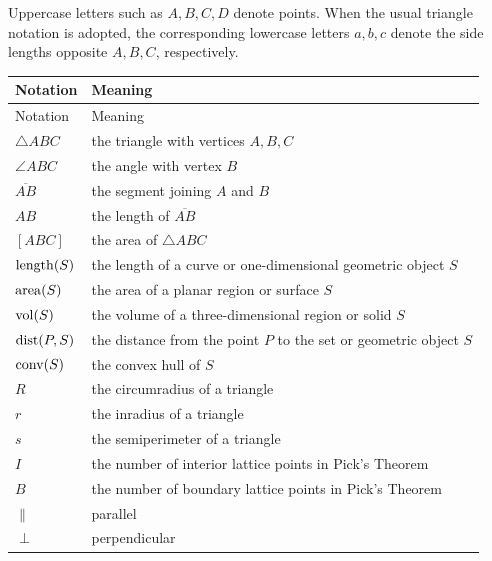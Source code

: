     Uppercase letters such as $A,B,C,D$ denote points. When the usual triangle
    notation is adopted, the corresponding lowercase letters $a,b,c$ denote the
    side lengths opposite $A,B,C$, respectively.

    \vspace{0.5em}

    {\small
    \renewcommand{\arraystretch}{1.18}
    \begin{longtable}{@{}L{0.24\textwidth}L{0.68\textwidth}@{}}
        \toprule
        Notation & Meaning \\
        \midrule
        \endfirsthead

        \toprule
        Notation & Meaning \\
        \midrule
        \endhead

        \bottomrule
        \endlastfoot

        $\triangle ABC$ & the triangle with vertices $A,B,C$ \\
        $\angle ABC$ & the angle with vertex $B$ \\
        $\overline{AB}$ & the segment joining $A$ and $B$ \\
        $AB$ & the length of $\overline{AB}$ \\
        $[ABC]$ & the area of $\triangle ABC$ \\
        $\operatorname{length}(S)$ & the length of a curve or one-dimensional geometric object $S$ \\
        $\operatorname{area}(S)$ & the area of a planar region or surface $S$ \\
        $\operatorname{vol}(S)$ & the volume of a three-dimensional region or solid $S$ \\
        $\operatorname{dist}(P,S)$ & the distance from the point $P$ to the set or geometric object $S$ \\
        $\operatorname{conv}(S)$ & the convex hull of $S$ \\
        $R$ & the circumradius of a triangle \\
        $r$ & the inradius of a triangle \\
        $s$ & the semiperimeter of a triangle \\
        $I$ & the number of interior lattice points in Pick's Theorem \\
        $B$ & the number of boundary lattice points in Pick's Theorem \\
        $\parallel$ & parallel \\
        $\perp$ & perpendicular \\
    \end{longtable}
    }

